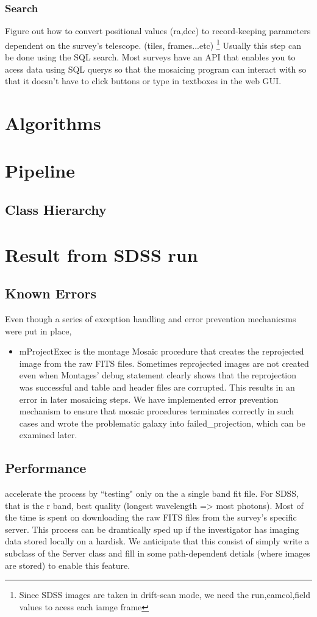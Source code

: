 \documentclass[5p]{elsarticle}
\begin{document}
		\subsubsection{Search}
			Figure out how to convert positional values (ra,dec) to record-keeping parameters dependent on the survey's telescope. (tiles, frames...etc) \footnote{Since SDSS images are taken in drift-scan mode, we need the run,camcol,field values to acess each iamge frame} Usually this step can be done using the SQL search. 
Most surveys have an API that enables you to acess data using SQL querys so that the mosaicing program can interact with so that it doesn't have to  click buttons or type in textboxes in the web GUI. 
\section{Algorithms}
\section{Pipeline}
	\subsection{Class Hierarchy}
\section{Result from SDSS run}
	\subsection{Known Errors}
		
	Even though a series of exception handling and error prevention mechanicsms were put in place, 
	 	\begin{itemize}
	 		\item mProjectExec is the montage Mosaic procedure that creates the reprojected image from the raw FITS files. Sometimes reprojected images are not created even when Montages' debug statement clearly shows that the reprojection was successful and table and header files are corrupted. This results in an error in later mosaicing steps. We have implemented error prevention mechanism to ensure that mosaic procedures terminates correctly in such cases and wrote the problematic galaxy into failed\_projection, which can be examined later.
	 	\end{itemize}
	
	\subsection{Performance}
	accelerate the process by ``testing" only on the a single band fit file. For SDSS, that is the r band, best quality (longest wavelength => most photons).  Most of the time is spent on downloading the raw FITS files from the survey's specific server. This process can be dramtically sped up if the investigator has imaging data stored locally on a hardisk. We anticipate that this consist of 	 simply write a subclass of the Server class and fill in some path-dependent detials (where images are stored) to enable this feature.
\end{document}
